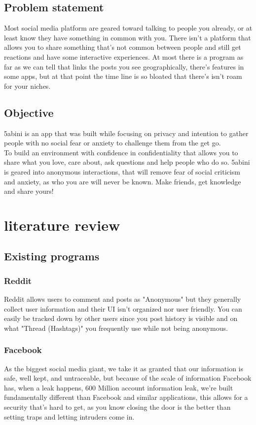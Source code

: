 \documentclass[12pt]{article}
\begin{document}
\subsection{Problem statement}
Most social media platform are geared toward talking to people you already, or at least know they have something in common with you. There isn't a platform that allows you to share something that's not common between people and still get reactions and have some interactive experiences. At most there is a program as far as we can tell that links the posts you see geographically, there's features in some apps, but at that point the time line is so bloated that there's isn't roam for your niches.\\ 
\subsection{Objective}
5abini is an app that was built while focusing on privacy and intention to gather people with no social fear or anxiety to challenge them from the get go. \\ To  build an environment with confidence in confidentiality that allows you to share what you love, care about, ask questions and help people who do so. 5abini is geared into anonymous interactions, that will remove fear of social criticism and anxiety, as who you are will never be known. Make friends, get knowledge and share yours!



\section{literature review}
\subsection{Existing programs}
\subsubsection{Reddit}
Reddit allows users to comment and posts as "Anonymous" but they generally collect user information and their UI isn't organized nor user friendly. You can easily be tracked down by other users since you post history is visible and on what "Thread (Hashtags)" you frequently use while not being anonymous.
\subsubsection{Facebook}
As the biggest social media giant, we take it as granted that our information is safe, well kept, and untraceable, but because of the scale of information Facebook has, when a leak happens, 600 Million account information leak, we're built fundamentally different than Facebook and similar applications, this allows for a security that's hard to get, as you know closing the door is the better than setting traps and letting intruders come in.
\end{document}
